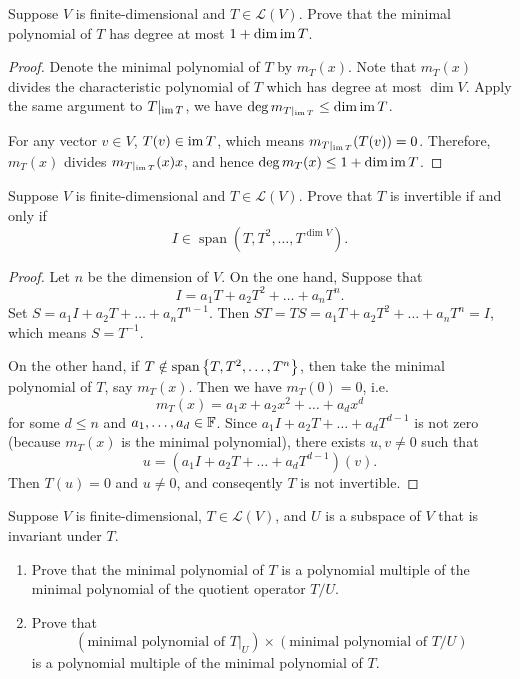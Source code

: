 \documentclass{article}
\begin{document}
\begin{problem}[5B-21]
Suppose $V$ is finite-dimensional and $T \in \mathcal{L}(V)$. Prove that the minimal polynomial of $T$ has degree at most $1 + \dim\operatorname{im} T$.
\end{problem}

\begin{proof}
  Denote the minimal polynomial of \( T \) by \( m_T(x) \). Note that \( m_T(x) \) divides the characteristic polynomial of \( T \) which has degree at most \( \dim V \). Apply the same argument to \( T|_{\operatorname{im} T} \), we have \( \deg m_{T|_{\operatorname{im} T}}\le\dim\operatorname{im} T \). \par
  For any vector \( v\in V \), \( T(v)\in\operatorname{im} T \), which means \( m_{T|_{\operatorname{im} T}}(T(v))=0 \). Therefore, \( m_T(x) \) divides \( m_{T|_{\operatorname{im} T}}(x)x \), and hence \( \deg m_T(x)\le 1 + \dim\operatorname{im} T \).
\end{proof}



\begin{problem}[5B-22]
Suppose $V$ is finite-dimensional and $T \in \mathcal{L}(V)$. Prove that $T$ is invertible if and only if
\[
I \in \operatorname{span}(T, T^2, \ldots, T^{\dim V}).
\]
\end{problem}

\begin{proof}
  Let \( n \) be the dimension of \( V \). On the one hand, Suppose that
  \[ I=a_1T+a_2T^2+\dots+a_nT^n. \]
  Set \( S=a_1I+a_2T+\dots+a_nT^{n-1} \). Then \( ST=TS=a_1T+a_2T^2+\dots+a_nT^n=I \), which means \( S=T^{-1} \).\par
  On the other hand, if \( T\notin\operatorname{span} \left\{ T,T^2,\dots,T^n \right\} \), then take the minimal polynomial of \( T \), say \( m_T(x) \). Then we have \( m_T(0)=0 \), i.e.
  \[ m_T(x)=a_1x+a_2x^2+\dots+a_dx^d \]
  for some \( d\le n \) and \( a_1,\dots,a_d\in\mathbb{F} \). Since \( a_1I+a_2T+\dots+a_dT^{d-1} \) is not zero (because \( m_T(x) \) is the minimal polynomial), there exists \( u,v\neq0 \) such that
  \[ u=(a_1I+a_2T+\dots+a_dT^{d-1})(v). \]
  Then \( T(u)=0 \) and \( u\neq 0 \), and conseqently \( T \) is not invertible.
\end{proof}



\begin{problem}[5B-25]
Suppose $V$ is finite-dimensional, $T \in \mathcal{L}(V)$, and $U$ is a subspace of $V$ that is invariant under $T$.
\begin{enumerate}[label=(\alph*)]
  \item Prove that the minimal polynomial of $T$ is a polynomial multiple of the minimal polynomial of the quotient operator $T/U$.
  \item Prove that
  \[
  (\text{minimal polynomial of } T|_U)\times(\text{minimal polynomial of } T/U)
  \]
  is a polynomial multiple of the minimal polynomial of $T$.
\end{enumerate}
\end{problem}
\end{document}
